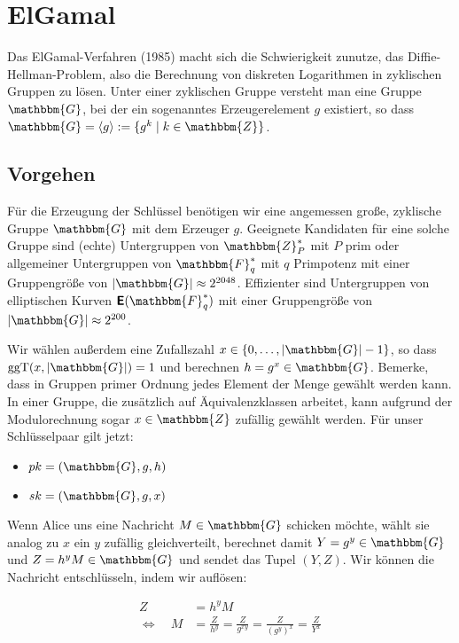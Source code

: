 \section{ElGamal}
\label{ch:asymenc:elgamal}
Das ElGamal-Verfahren (1985) macht sich die Schwierigkeit zunutze, das Diffie-Hellman-Problem, also die Berechnung von diskreten Logarithmen in zyklischen Gruppen zu
lösen. Unter einer zyklischen Gruppe versteht man eine Gruppe $\mathbbm{G}$, bei der ein sogenanntes Erzeugerelement $g$ existiert, so dass $\mathbbm{G} = \langle g \rangle := \{g^k \mid k \in \mathbbm{Z}\}$.

\subsection{Vorgehen}
Für die Erzeugung der Schlüssel benötigen wir eine angemessen große, zyklische Gruppe $\mathbbm{G}$ mit dem Erzeuger $g$.
Geeignete Kandidaten für eine solche Gruppe sind (echte) Untergruppen von $\mathbbm{Z}^*_P$ mit $P$ prim oder allgemeiner Untergruppen von $\mathbbm{F}^*_q$
mit $q$ Primpotenz mit einer Gruppengröße von $|\mathbbm{G}| \approx 2^{2048}$. Effizienter sind Untergruppen von elliptischen Kurven
$\boldsymbol{\mathsf{E}}(\mathbbm{F}^*_q)$ mit einer Gruppengröße von $|\mathbbm{G}| \approx 2^{200}$.

Wir wählen außerdem eine Zufallszahl $x \in \{0, \dots, \vert \mathbbm{G} \vert - 1\}$, so dass $\text{ggT}(x, \vert \mathbbm{G} \vert) = 1$ und berechnen $h = g^x \in \mathbbm{G}$. Bemerke, dass in Gruppen primer Ordnung jedes Element der Menge gewählt werden kann. In einer Gruppe, die zusätzlich auf Äquivalenzklassen arbeitet, kann aufgrund der Modulorechnung sogar $x \in \mathbbm{Z}$ zufällig gewählt werden. Für unser Schlüsselpaar gilt jetzt: 

\begin{itemize}
  \item $pk = (\mathbbm{G}, g, h)$
  \item $sk = (\mathbbm{G}, g, x)$
\end{itemize}

Wenn Alice uns eine Nachricht $M \in \mathbbm{G}$ schicken möchte, wählt sie analog zu $x$ ein $y$ zufällig gleichverteilt, berechnet damit $Y = g^y \in \mathbbm{G}$ und $Z = h^y M \in \mathbbm{G}$ und sendet das Tupel $(Y,Z)$. Wir können die Nachricht entschlüsseln, indem wir auflösen:

\begin{align*}
Z &= h^y M\\
\Leftrightarrow \quad M& = \frac{Z}{h^y}
 = \frac{Z}{g^{xy}}
 = \frac{Z}{(g^y)^x}
 = \frac{Z}{Y^x}
\end{align*}

